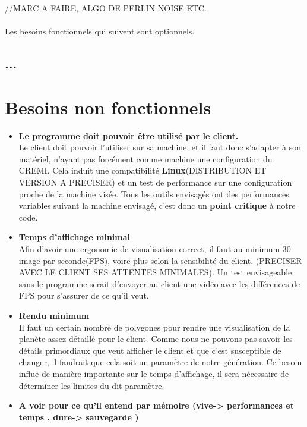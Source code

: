 \documentclass[a4paper]{article}
\begin{document}
//MARC A FAIRE, ALGO DE PERLIN NOISE ETC.\\
\\
Les besoins fonctionnels qui suivent sont optionnels.

\subsection{...}


\newpage
\section{Besoins non fonctionnels}

    \begin{itemize}
    
    \item \textbf{Le programme doit pouvoir être utilisé par le client.} \\
    Le client doit pouvoir l'utiliser sur sa machine, et il faut donc s'adapter à son matériel, n'ayant pas forcément comme machine une configuration du CREMI.
    Cela induit une compatibilité \textbf{Linux}(DISTRIBUTION ET VERSION A PRECISER) et un test de performance sur une configuration proche de la machine visée. Tous les outils envisagés ont des performances variables suivant la machine envisagé, c'est donc un \textbf{point critique} à notre code.
    
    \item \textbf{Temps d'affichage minimal} \\
    Afin d'avoir une ergonomie de visualisation correct, il faut au minimum 30 image par seconde(FPS), voire plus selon la sensibilité du client. (PRECISER AVEC LE CLIENT SES ATTENTES MINIMALES).
    Un test envisageable sans le programme serait d'envoyer au client une vidéo avec les différences de FPS pour s'assurer de ce qu'il veut.
    
    \item \textbf{Rendu minimum} \\
    Il faut un certain nombre de polygones pour rendre une visualisation de la planète assez détaillé pour le client. Comme nous ne pouvons pas savoir les détails primordiaux que veut afficher le client et que c'est susceptible de changer, il faudrait que cela soit un paramètre de notre génération. Ce besoin influe de manière importante sur le temps d'affichage, il sera nécessaire de déterminer les limites du dit paramètre.
    
    \item \textbf{A voir pour ce qu'il entend par mémoire (vive-> performances et temps , dure-> sauvegarde )}
    \end{itemize}
\end{document}
